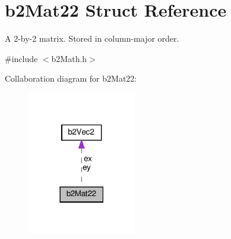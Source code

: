 \hypertarget{structb2Mat22}{}\section{b2\+Mat22 Struct Reference}
\label{structb2Mat22}


A 2-\/by-\/2 matrix. Stored in column-\/major order.  




{\ttfamily \#include $<$b2\+Math.\+h$>$}



Collaboration diagram for b2\+Mat22\+:
\nopagebreak
\begin{figure}[H]
\begin{center}
\leavevmode
\includegraphics[width=134pt]{structb2Mat22__coll__graph}
\end{center}
\end{figure}
